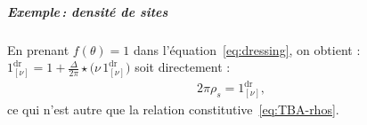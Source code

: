 \subparagraph{Exemple\,: densité de sites}

En prenant $f(\theta) = 1$ dans l’équation~\eqref{eq:dressing}, on obtient :
\(
1^{\mathrm{dr}}_{[\nu]}=1+\frac{\Delta}{2\pi}\star\bigl(\nu\,1^{\mathrm{dr}}_{[\nu]}\bigr)
\) soit directement : 
\begin{eqnarray}
	2\pi\rho_s = 1^{\mathrm{dr}}_{[\nu]},\label{eq:TBA-rhos-2}
\end{eqnarray}
ce qui n’est autre que la relation constitutive~\eqref{eq:TBA-rhos}.


